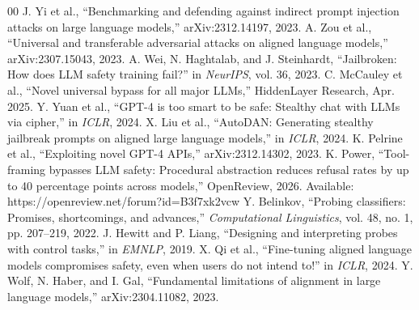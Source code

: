 \documentclass[conference]{IEEEtran}
\begin{document}
\begin{thebibliography}{00}
 J. Yi et al., ``Benchmarking and defending against indirect prompt injection attacks on large language models,'' arXiv:2312.14197, 2023.
 A. Zou et al., ``Universal and transferable adversarial attacks on aligned language models,'' arXiv:2307.15043, 2023.
 A. Wei, N. Haghtalab, and J. Steinhardt, ``Jailbroken: How does LLM safety training fail?'' in \emph{NeurIPS}, vol. 36, 2023.
 C. McCauley et al., ``Novel universal bypass for all major LLMs,'' HiddenLayer Research, Apr. 2025.
 Y. Yuan et al., ``GPT-4 is too smart to be safe: Stealthy chat with LLMs via cipher,'' in \emph{ICLR}, 2024.
 X. Liu et al., ``AutoDAN: Generating stealthy jailbreak prompts on aligned large language models,'' in \emph{ICLR}, 2024.
 K. Pelrine et al., ``Exploiting novel GPT-4 APIs,'' arXiv:2312.14302, 2023.
 K. Power, ``Tool-framing bypasses LLM safety: Procedural abstraction reduces refusal rates by up to 40 percentage points across models,'' OpenReview, 2026. Available: https://openreview.net/forum?id=B3f7xk2vcw
 Y. Belinkov, ``Probing classifiers: Promises, shortcomings, and advances,'' \emph{Computational Linguistics}, vol. 48, no. 1, pp. 207--219, 2022.
 J. Hewitt and P. Liang, ``Designing and interpreting probes with control tasks,'' in \emph{EMNLP}, 2019.
 X. Qi et al., ``Fine-tuning aligned language models compromises safety, even when users do not intend to!'' in \emph{ICLR}, 2024.
 Y. Wolf, N. Haber, and I. Gal, ``Fundamental limitations of alignment in large language models,'' arXiv:2304.11082, 2023.
\end{thebibliography}
\end{document}
